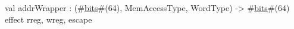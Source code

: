 val addrWrapper : (#\hyperref[zbits]{bits}#(64), MemAccessType, WordType) -> #\hyperref[zbits]{bits}#(64) effect {rreg, wreg, escape}
